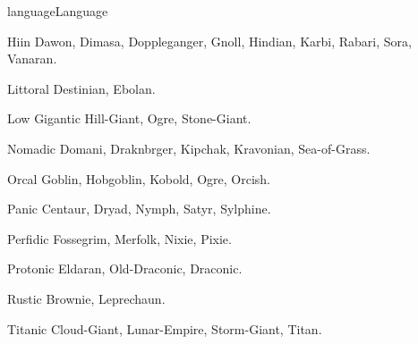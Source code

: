 \begin{Skill}[2.1]{language}{Language}
\begin{Description}
\item[Hiin]  Dawon,  Dimasa,  Doppleganger,  Gnoll,  Hindian, Karbi, Rabari, Sora, Vanaran. 

\item[Littoral] Destinian, Ebolan. 

\item[Low] Gigantic Hill-Giant, Ogre, Stone-Giant. 

\item[Nomadic] Domani, Draknbrger, Kipchak, Kravonian, Sea-of-Grass.

\item[Orcal] Goblin, Hobgoblin, Kobold, Ogre, Orcish.  

\item[Panic] Centaur, Dryad, Nymph, Satyr, Sylphine.  

\item[Perfidic] Fossegrim, Merfolk, Nixie, Pixie.  

\item[Protonic] Eldaran, Old-Draconic, Draconic.  

\item[Rustic] Brownie, Leprechaun. 

\item[Titanic]  Cloud-Giant,  Lunar-Empire,  Storm-Giant, 
Titan. 

\end{Description}

\end{Skill}
